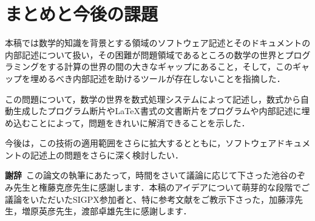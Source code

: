 \section {まとめと今後の課題}
\label {sec: summary}

本稿では数学的知識を背景とする領域のソフトウェア記述とそのドキュメントの内部記述について扱い，その困難が問題領域であるところの数学の世界とプログラミングをする計算の世界の間の大きなギャップにあること，そして，このギャップを埋めるべき内部記述を助けるツールが存在しないことを指摘した．

この問題について，数学の世界を数式処理システムによって記述し，数式から自動生成したプログラム断片や\LaTeX{}書式の文書断片をプログラムや内部記述に埋め込むことによって，問題をきれいに解消できることを示した．

今後は，この技術の適用範囲をさらに拡大するとともに，ソフトウェアドキュメントの記述上の問題をさらに深く検討したい．

\textbf {謝辞}\
この論文の執筆にあたって，時間をさいて議論に応じて下さった池谷のぞみ先生と権藤克彦先生に感謝します．本稿のアイデアについて萌芽的な段階でご議論をいただいたSIGPX参加者と、特に参考文献をご教示下さった，加藤淳先生，増原英彦先生，渡部卓雄先生に感謝します．
